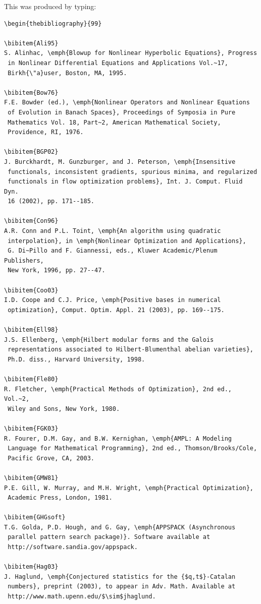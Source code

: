 \documentclass[]{interact}
\theoremstyle{plain}%
\theoremstyle{definition}
\theoremstyle{remark}
\begin{document}
\bigskip
\noindent This was produced by typing:
\medskip
\begin{verbatim}
\begin{thebibliography}{99}

\bibitem{Ali95}
S. Alinhac, \emph{Blowup for Nonlinear Hyperbolic Equations}, Progress
 in Nonlinear Differential Equations and Applications Vol.~17,
 Birkh{\"a}user, Boston, MA, 1995.

\bibitem{Bow76}
F.E. Bowder (ed.), \emph{Nonlinear Operators and Nonlinear Equations
 of Evolution in Banach Spaces}, Proceedings of Symposia in Pure
 Mathematics Vol. 18, Part~2, American Mathematical Society,
 Providence, RI, 1976.

\bibitem{BGP02}
J. Burckhardt, M. Gunzburger, and J. Peterson, \emph{Insensitive
 functionals, inconsistent gradients, spurious minima, and regularized
 functionals in flow optimization problems}, Int. J. Comput. Fluid Dyn.
 16 (2002), pp. 171--185.

\bibitem{Con96}
A.R. Conn and P.L. Toint, \emph{An algorithm using quadratic
 interpolation}, in \emph{Nonlinear Optimization and Applications},
 G. Di~Pillo and F. Giannessi, eds., Kluwer Academic/Plenum Publishers,
 New York, 1996, pp. 27--47.

\bibitem{Coo03}
I.D. Coope and C.J. Price, \emph{Positive bases in numerical
 optimization}, Comput. Optim. Appl. 21 (2003), pp. 169--175.

\bibitem{Ell98}
J.S. Ellenberg, \emph{Hilbert modular forms and the Galois
 representations associated to Hilbert-Blumenthal abelian varieties},
 Ph.D. diss., Harvard University, 1998.

\bibitem{Fle80}
R. Fletcher, \emph{Practical Methods of Optimization}, 2nd ed., Vol.~2,
 Wiley and Sons, New York, 1980.

\bibitem{FGK03}
R. Fourer, D.M. Gay, and B.W. Kernighan, \emph{AMPL: A Modeling
 Language for Mathematical Programming}, 2nd ed., Thomson/Brooks/Cole,
 Pacific Grove, CA, 2003.

\bibitem{GMW81}
P.E. Gill, W. Murray, and M.H. Wright, \emph{Practical Optimization},
 Academic Press, London, 1981.

\bibitem{GHGsoft}
T.G. Golda, P.D. Hough, and G. Gay, \emph{APPSPACK (Asynchronous
 parallel pattern search package)}. Software available at
 http://software.sandia.gov/appspack.

\bibitem{Hag03}
J. Haglund, \emph{Conjectured statistics for the {$q,t$}-Catalan
 numbers}, preprint (2003), to appear in Adv. Math. Available at
 http://www.math.upenn.edu/$\sim$jhaglund.


\end{verbatim}
\end{document}
